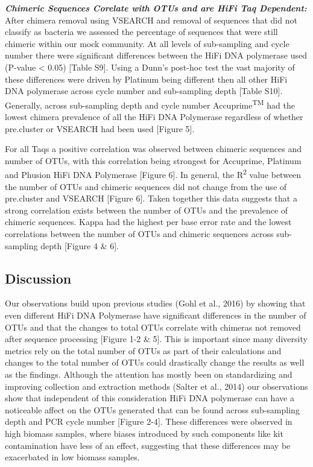 \documentclass[12pt,]{article}
\begin{document}
\textbf{\emph{Chimeric Sequences Corelate with OTUs and are HiFi Taq
Dependent:}} After chimera removal using VSEARCH and removal of
sequences that did not classify as bacteria we assessed the percentage
of sequences that were still chimeric within our mock community. At all
levels of sub-sampling and cycle number there were significant
differences between the HiFi DNA polymerase used (P-value \textless{}
0.05) {[}Table S9{]}. Using a Dunn's post-hoc test the vast majority of
these differences were driven by Platinum being different then all other
HiFi DNA polymerase across cycle number and sub-sampling depth {[}Table
S10{]}. Generally, across sub-sampling depth and cycle number
Accuprime\textsuperscript{TM} had the lowest chimera prevalence of all
the HiFi DNA Polymerase regardless of whether pre.cluster or VSEARCH had
been used {[}Figure 5{]}.

For all Taqs a positive correlation was observed between chimeric
sequences and number of OTUs, with this correlation being strongest for
Accuprime, Platinum and Phusion HiFi DNA Polymerase {[}Figure 6{]}. In
general, the R\textsuperscript{2} value between the number of OTUs and
chimeric sequences did not change from the use of pre.cluster and
VSEARCH {[}Figure 6{]}. Taken together this data suggests that a strong
correlation exists between the number of OTUs and the prevalence of
chimeric sequences. Kappa had the highest per base error rate and the
lowest correlations between the number of OTUs and chimeric sequences
across sub-sampling depth {[}Figure 4 \& 6{]}.

\newpage

\subsection{Discussion}\label{discussion}

Our observations build upon previous studies (Gohl et al., 2016) by
showing that even different HiFi DNA Polymerase have significant
differences in the number of OTUs and that the changes to total OTUs
correlate with chimeras not removed after sequence processing {[}Figure
1-2 \& 5{]}. This is important since many diversity metrics rely on the
total number of OTUs as part of their calculations and changes to the
total number of OTUs could drastically change the results as well as the
findings. Although the attention has mostly been on standardizing and
improving collection and extraction methods (Salter et al., 2014) our
observations show that independent of this consideration HiFi DNA
polymerase can have a noticeable affect on the OTUs generated that can
be found across sub-sampling depth and PCR cycle number {[}Figure
2-4{]}. These differences were observed in high biomass samples, where
biases introduced by such components like kit contamination have less of
an effect, suggesting that these differences may be exacerbated in low
biomass samples.
\end{document}
